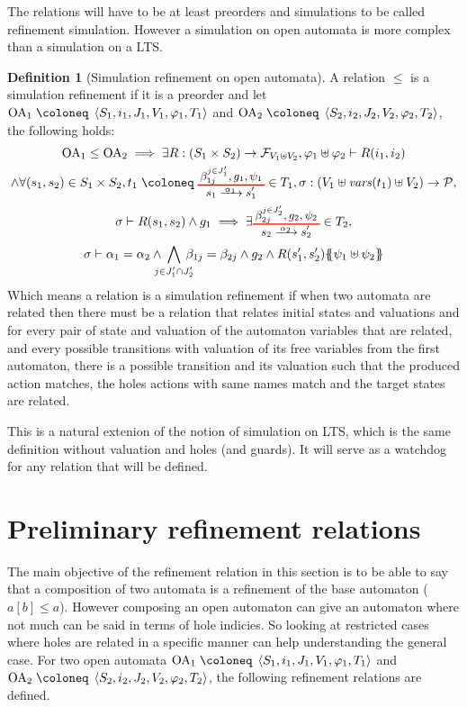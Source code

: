 \documentclass{article}
\theoremstyle{plain}
\theoremstyle{definition}
\newtheorem{defi}{Definition}
\newcommand\mpar[1]{{\left(#1\right)}}
\newcommand\mbrk[1]{{\left[#1\right]}}
\newcommand\mbrc[1]{{\left\{#1\right\}}}
\newcommand\psubst[1]{\mbrc{\!\!\mbrc{#1}\!\!}}
\newcommand\subbox[1]{{\makebox[.5\width]{\(\scriptstyle #1\)}}}
\newcommand\defobject{\DOTSB\;{\coloneq}\;}
\newcommand\fvars[1]{{\mathit{vars}\mpar{#1}}}
\newcommand\formulae{{\mathcal{F}}}
\newcommand\values{{\mathcal{P}}}
\newcommand\OA[6]{\left<#1,#2,#3,#4,#5,#6\right>}
\newcommand\OT[6]{\text{\small\(%
	\setlength\arraycolsep{2pt}\everymath{\displaystyle}%
	\renewcommand\arraystretch{1}%
	\begin{array}{c}%
	#4,#5,#6 \\\noalign{\color{red}\hrule height 1pt}
	#1\xrightarrow{\raisebox{-1.5pt}[.8\height][0pt]{\makebox[1.4\width]{\(\scriptstyle #3\)}}}#2
	\end{array}\)}}
\newcommand\OTx[4]{\OT{s_{#1}}{s'_{#1 #2}}{\alpha_{#1 #2}}{\beta_{#3 j}^{j \in J'_{#4}}}{g_{#1 #2}}{\psi_{#1 #2}}}
\begin{document}
The relations will have to be at least preorders and simulations to be called refinement simulation.
However a simulation on open automata is more complex than a simulation on a LTS.
\begin{defi}[Simulation refinement on open automata]
A relation \(\leq\) is a simulation refinement if it is a preorder and let \(\mathrm{OA}_1 \defobject \OA{S_1}{i_1}{J_1}{V_1}{\varphi_1}{T_1}\) and \(\mathrm{OA}_2 \defobject \OA{S_2}{i_2}{J_2}{V_2}{\varphi_2}{T_2}\), the following holds:
\begin{multline*}
	\mathrm{OA}_1 \leq \mathrm{OA}_2 \implies \exists R: \mpar{S_1 \times S_2} \to \formulae_{V_1 \uplus V_2}, \varphi_1 \uplus \varphi_2 \vdash R\mpar{i_1, i_2} \\
	\wedge \forall \mpar{s_1, s_2} \in S_1 \times S_2, t_1 \defobject \OTx{1}{}{1}{1} \in T_1, \sigma: \mpar{V_1 \uplus \fvars{t_1} \uplus V_2} \to \values, \\
	\sigma \vdash R\mpar{s_1, s_2} \wedge g_1 \implies \exists \OTx{2}{}{2}{2} \in T_2, \\
	\sigma \vdash \alpha_1 = \alpha_2 \wedge \bigwedge_\subbox{j \in J'_1 \cap J'_2} \beta_{1j} = \beta_{2j} \wedge g_2 \wedge R\mpar{s'_1, s'_2}\psubst{\psi_1 \uplus \psi_2}
\end{multline*}
Which means a relation is a simulation refinement if when two automata are related then there must be a relation that relates initial states and valuations and for every pair of state and valuation of the automaton variables that are related, and every possible transitions with valuation of its free variables from the first automaton, there is a possible transition and its valuation such that the produced action matches, the holes actions with same names match and the target states are related.
\end{defi}
This is a natural extenion of the notion of simulation on LTS, which is the same definition without valuation and holes (and guards).
It will serve as a watchdog for any relation that will be defined.



\section{Preliminary refinement relations}
The main objective of the refinement relation in this section is to be able to say that a composition of two automata is a refinement of the base automaton (\(a\mbrk{b} \leq a\)).
However composing an open automaton can give an automaton where not much can be said in terms of hole indicies.
So looking at restricted cases where holes are related in a specific manner can help understanding the general case.
For two open automata \(\mathrm{OA}_1 \defobject \OA{S_1}{i_1}{J_1}{V_1}{\varphi_1}{T_1}\) and \(\mathrm{OA}_2 \defobject \OA{S_2}{i_2}{J_2}{V_2}{\varphi_2}{T_2}\), the following refinement relations are defined.
\end{document}
